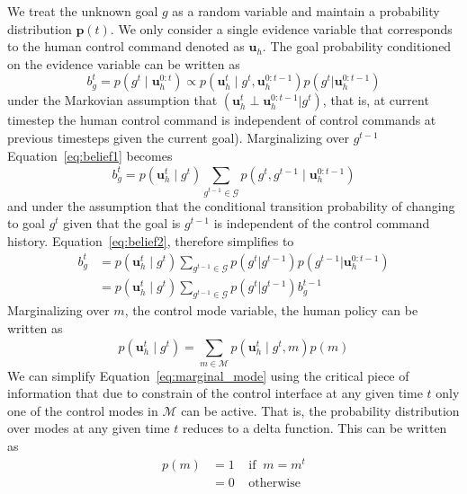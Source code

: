 \documentclass[conference]{IEEEtran}
\begin{document}
We treat the unknown goal $g$ as a random variable and  maintain a probability distribution $\boldsymbol{p}(t)$. We only consider a single evidence variable that corresponds to the human control command denoted as $\boldsymbol{u}_h$. The goal probability conditioned on the evidence variable can be written as 
\begin{equation}\label{eq:belief1}
b^t_g = p(g^t \;|\; \boldsymbol{u}_h^{0:t}) \propto p(\boldsymbol{u}_h^t\;|\;g^t,\boldsymbol{u}_h^{0:t-1})p(g^t|\boldsymbol{u}_h^{0:t-1})
\end{equation}
under the Markovian assumption that $(\boldsymbol{u}_h^t \perp \boldsymbol{u}_h^{0:t-1} | g^t)$, that is, at current timestep the human control command is independent of control commands at previous timesteps given the current goal). Marginalizing over $g^{t-1}$ Equation~\ref{eq:belief1} becomes
\begin{equation}\label{eq:belief2}
b^t_g = p(\boldsymbol{u}_h^t \;|\; g^t) \sum_{g^{t-1} \in \mathcal{G}}^{} p(g^t, g^{t-1} \; | \; \boldsymbol{u}_h^{0:t-1})
\end{equation}
and under the assumption that the conditional transition probability of changing to goal $g^t$ given that the goal is $g^{t-1}$ is independent of the control command history. Equation~\ref{eq:belief2}, therefore simplifies to
\begin{equation} \label{eq:recursive_belief}
\begin{split}
b^t_g & = p(\boldsymbol{u}_h^t \;|\; g^t) \sum_{g^{t-1} \in \mathcal{G}}^{} p(g^t | g^{t-1})  p(g^{t-1} | \boldsymbol{u}_h^{0:t-1})  \\
& = p(\boldsymbol{u}_h^t \;|\; g^t) \sum_{g^{t-1} \in \mathcal{G}}^{} p(g^t | g^{t-1}) b^{t-1}_{g}
\end{split}
\end{equation}
Marginalizing over $m$, the control mode variable, the human policy can be written as 
\begin{equation} \label{eq:marginal_mode}
p(\boldsymbol{u}_h^t \;|\; g^t) = \sum_{m \in \mathcal{M}}^{} p(\boldsymbol{u}_h^t \;|\; g^t, m)p(m)
\end{equation}
We can simplify Equation~\ref{eq:marginal_mode} using the critical piece of information that due to constrain of the control interface at any given time $t$ only one of the control modes in $\mathcal{M}$ can be active. That is, the probability distribution over modes at any given time $t$ reduces to a delta function. This can be written as
\begin{equation}\label{eq:mode_prob}
\begin{split}
p(m) & = 1 \;\;\;\; \text{if} \;\; m = m^t \\
& = 0 \;\;\;\; \text{otherwise}
\end{split}
\end{equation}
\end{document}
